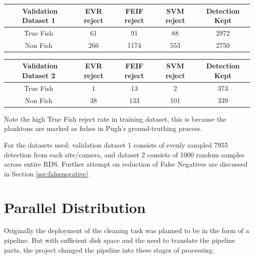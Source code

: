 \documentclass[bsc,logo,twoside,fullspacing,parskip]{infthesis}
\begin{document}
\begin{center}
\begin{tabular}{|C|C|C|C|C|}
\hline 
$ $ Validation Dataset 1 & EVR reject & FEIF reject & SVM reject & Detection Kept\\
\hline 
True Fish & 61 & 91 & 88 & 2972 \\
Non Fish & 266 & 1174  & 553 & 2750 \\
\hline 
\end{tabular}
\end{center}

\begin{center}
\begin{tabular}{|C|C|C|C|C|}
\hline 
$ $ Validation Dataset 2 & EVR reject & FEIF reject & SVM reject & Detection Kept\\
\hline 
True Fish & 1 & 13  & 2 & 373 \\
Non Fish & 38 & 133 & 101 & 339 \\
\hline 
\end{tabular}
\end{center}

Note the high True Fish reject rate in training dataset, this is because the planktons are marked as fishes in Pugh's ground-truthing process. 

For the datasets used: validation dataset 1 consists of evenly sampled 7955 detection from each site/camera, and dataset 2 consists of 1000 random samples across entire RDS.
Further attempt on reduction of False Negatives are discussed in Section \ref{sec:falsenegative}.




\chapter{Parallel Distribution}
\label{chap:parallel}

Originally the deployment of the cleaning task was planned to be in the form of a pipeline.
But with sufficient disk space and the need to translate the pipeline parts, the project changed the pipeline into these stages of processing:
\end{document}
